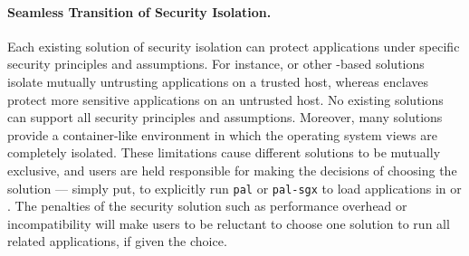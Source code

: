 {\paragraph{Seamless Transition of Security Isolation.}
Each existing solution of security isolation can protect applications
under specific security principles and assumptions.
For instance, \graphene{} or other \picoproc{}-based solutions isolate mutually untrusting applications on a trusted host,
whereas enclaves protect more sensitive applications on an untrusted host.
No existing solutions can support all security principles and assumptions.
Moreover, many solutions provide a container-like environment in which the operating system views are completely isolated.
These limitations cause different solutions to be mutually exclusive,
and users are held responsible for making the decisions of choosing the solution
--- simply put, to explicitly run {\tt pal} or {\tt pal-sgx} to load applications in \graphene{} or \gsgx{}. 
The penalties of the security solution such as performance overhead or incompatibility
will make users to be reluctant
to choose one solution to run all related applications,
if given the choice.


}
